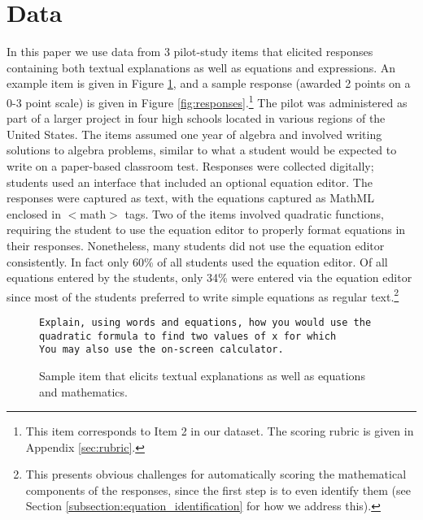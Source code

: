 \documentclass[11pt,a4paper]{article}
\begin{document}
\section{Data}
\label{section:data}
In this paper we use data from 3 pilot-study items that elicited responses containing both textual explanations as well as equations and expressions. An example item is given in Figure \ref{fig:item}, and a sample response (awarded 2 points on a 0-3 point scale) is given in Figure \ref{fig:responses}.\footnote{This item corresponds to Item 2 in our dataset. The scoring rubric is given in Appendix \ref{sec:rubric}.} 
The pilot was administered as part of a larger project in four high schools located in various regions of the United States. The items assumed one year of algebra and involved writing solutions to algebra problems, similar to what a student would be expected to write on a paper-based classroom test. Responses were collected digitally; students used an interface that included an optional equation editor. The responses were captured as text, with the equations captured as MathML enclosed in $<$math$>$ tags. Two of the items involved quadratic functions, requiring the student to use the equation editor to properly format equations in their responses. Nonetheless, many students did not use the equation editor consistently. In fact only 60\% of all students used the equation editor. Of all equations entered by the students, only 34\% were entered via the equation editor since most of the students preferred to write simple equations as regular text.\footnote{This presents obvious challenges for automatically scoring the mathematical components of the responses, since the first step is to even identify them (see Section \ref{subsection:equation_identification} for how we address this).} 

\begin{figure}
    \small
    \texttt{Explain, using words and equations, how you would use the quadratic formula to find two values of x for which
    \\You may also use the on-screen calculator.}
    \caption{Sample item that elicits textual explanations as well as equations and mathematics.}
    \label{fig:item}
\end{figure}
\end{document}
